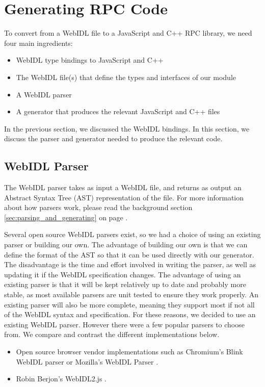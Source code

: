 \section{Generating RPC Code} %
\label{sec:generating_rpc_code}
To convert from a WebIDL file to a JavaScript and C++ RPC library, we need four main ingredients:

\begin{itemize}
	\item WebIDL type bindings to JavaScript and C++
	\item The WebIDL file(s) that define the types and interfaces of our module
	\item A WebIDL parser
	\item A generator that produces the relevant JavaScript and C++ files
\end{itemize}

In the previous section, we discussed the WebIDL bindings. In this section, we discuss the parser and generator needed to produce the relevant code.

\subsection{WebIDL Parser} %
\label{sub:webidl_parser_design}
The WebIDL parser takes as input a WebIDL file, and returns as output an Abstract Syntax Tree (AST) representation of the file. For more information about how parsers work, please read the background section \ref{sec:parsing_and_generating} on page \pageref{sec:parsing_and_generating}. 

Several open source WebIDL parsers exist, so we had a choice of using an existing parser or building our own. The advantage of building our own is that we can define the format of the AST so that it can be used directly with our generator. The disadvantage is the time and effort involved in writing the parser, as well as updating it if the WebIDL specification changes. The advantage of using an existing parser is that it will be kept relatively up to date and probably more stable, as most available parsers are unit tested to ensure they work properly. An existing parser will also be more complete, meaning they support most if not all of the WebIDL syntax and specification. For these reasons, we decided to use an existing WebIDL parser. However there were a few popular parsers to choose from. We compare and contrast the different implementations below.

\begin{itemize}
	\item Open source browser vendor implementations such as Chromium's Blink WebIDL parser \cite{chromiumwebidlparser} or Mozilla's WebIDL Parser \cite{mozillawebidlparser}.
	\item Robin Berjon's WebIDL2.js \cite{berjonwebidljs}.
\end{itemize}

